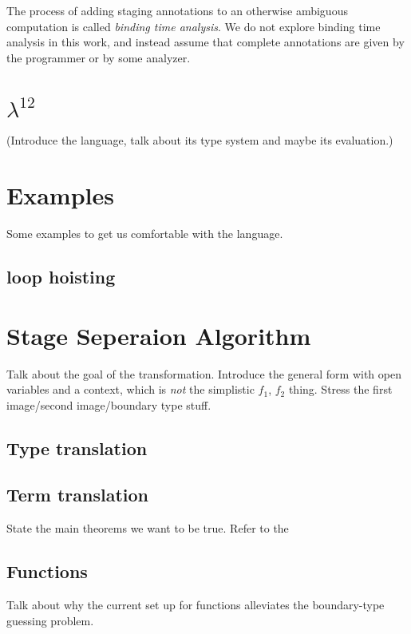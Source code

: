 \documentclass{article}
\begin{document}
The process of adding staging annotations to an otherwise ambiguous computation is called {\it binding time analysis}.  We do not explore binding time analysis in this work, and instead assume that complete annotations are given by the programmer or by some analyzer.

\section{$\lambda^{12}$}

(Introduce the language, talk about its type system and maybe its evaluation.)

\section{Examples}

Some examples to get us comfortable with the language.

\subsection{loop hoisting}

\section{Stage Seperaion Algorithm}

Talk about the goal of the transformation.  Introduce the general form with open variables and a context, which is {\em not} the simplistic $f_1$, $f_2$ thing.  Stress the first image/second image/boundary type stuff.

\subsection {Type translation}

\subsection{Term translation}

State the main theorems we want to be true.  Refer to the 

\subsection{Functions}

Talk about why the current set up for functions alleviates the boundary-type guessing problem.
\end{document}
